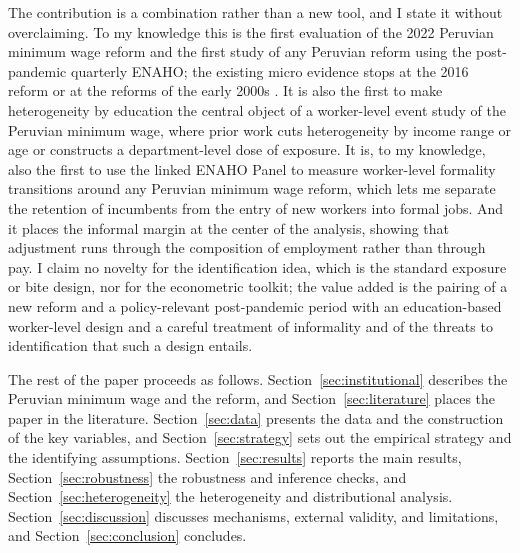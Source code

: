The contribution is a combination rather than a new tool, and I state it without overclaiming. To my knowledge this is the first evaluation of the 2022 Peruvian minimum wage reform and the first study of any Peruvian reform using the post-pandemic quarterly ENAHO; the existing micro evidence stops at the 2016 reform \citep{jimenez_2023} or at the reforms of the early 2000s \citep{jaramillo_lopez_2006, cespedes_2005}. It is also the first to make heterogeneity by education the central object of a worker-level event study of the Peruvian minimum wage, where prior work cuts heterogeneity by income range or age or constructs a department-level dose of exposure. It is, to my knowledge, also the first to use the linked ENAHO Panel to measure worker-level formality transitions around any Peruvian minimum wage reform, which lets me separate the retention of incumbents from the entry of new workers into formal jobs. And it places the informal margin at the center of the analysis, showing that adjustment runs through the composition of employment rather than through pay. I claim no novelty for the identification idea, which is the standard exposure or bite design, nor for the econometric toolkit; the value added is the pairing of a new reform and a policy-relevant post-pandemic period with an education-based worker-level design and a careful treatment of informality and of the threats to identification that such a design entails.

The rest of the paper proceeds as follows. Section~\ref{sec:institutional} describes the Peruvian minimum wage and the reform, and Section~\ref{sec:literature} places the paper in the literature. Section~\ref{sec:data} presents the data and the construction of the key variables, and Section~\ref{sec:strategy} sets out the empirical strategy and the identifying assumptions. Section~\ref{sec:results} reports the main results, Section~\ref{sec:robustness} the robustness and inference checks, and Section~\ref{sec:heterogeneity} the heterogeneity and distributional analysis. Section~\ref{sec:discussion} discusses mechanisms, external validity, and limitations, and Section~\ref{sec:conclusion} concludes.
